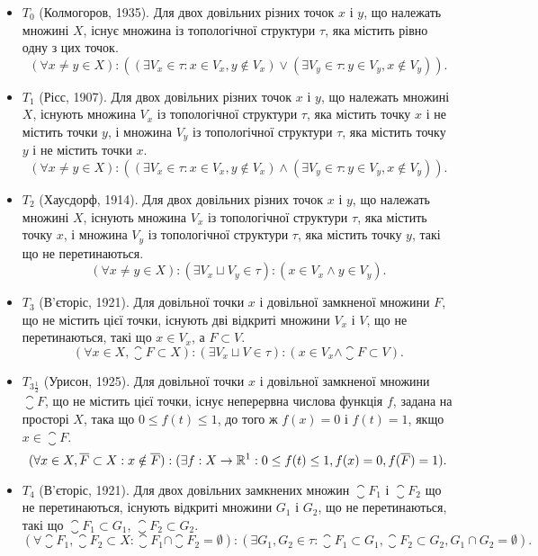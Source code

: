 \begin{itemize}
\item $T_0$ (Колмогоров, 1935). Для двох довільних різних точок
$x$ і $y$, що належать множині $X$, існує множина із
топологічної структури $\tau$, яка містить рівно одну з цих
точок.
\[ (\forall x \ne y \in X): ((\exists V_x \in \tau: x \in V_x, y \notin V_x) \lor (\exists V_y \in \tau: y \in V_y, x \notin V_y)). \]

\item $T_1$ (Рісс, 1907). Для двох довільних різних точок $x$ і $y$,
що належать множині $X$, існують множина $V_x$ із
топологічної структури $\tau$, яка містить точку $x$ і не
містить точки $y$, і множина $V_y$ із топологічної
структури $\tau$, яка містить точку $y$ і не містить точки $x$.
\[ (\forall x \ne y \in X): ((\exists V_x \in \tau: x \in V_x, y \notin V_x) \land (\exists V_y \in \tau: y \in V_y, x \notin V_y)). \]

\item $T_2$ (Хаусдорф, 1914). Для двох довільних різних точок $x$ і
$y$, що належать множині $X$, існують множина $V_x$ із
топологічної структури $\tau$, яка містить точку $x$, і
множина $V_y$ із топологічної структури $\tau$, яка містить
точку $y$, такі що не перетинаються.
\[ (\forall x \ne y \in X): (\exists V_x \sqcup V_y \in \tau): (x \in V_x \land y \in V_y). \]

\item $T_3$ (В'єторіс, 1921). Для довільної точки $x$ і довільної
замкненої множини $F$, що не містить цієї точки, існують
дві відкриті множини $V_x$ і $V$, що не перетинаються, такі
що $x \in V_x$, а $F \subset V$.
\[ (\forall x \in X, \closure{F} \subset X): (\exists V_x \sqcup V \in \tau): (x \in V_x \land \closure{F} \subset V). \]

\item $T_{3\frac{1}{2}}$ (Урисон, 1925). Для довільної точки $x$ і довільної
замкненої множини $\closure{F}$, що не містить цієї точки, існує
неперервна числова функція $f$, задана на просторі $X$,
така що $0 \le f(t) \le 1$, до того ж $f(x) = 0$ і $f(t) = 1$, якщо
$x \in \closure{F}$.
\begin{equation*}
(\forall x \in X, \overline{F} \subset X: x \notin \overline{F}):
(\exists f: X \to \mathbb{R}^1: 0 \le f(t) \le 1, f(x) = 0, f(\overline{F}) = 1).
\end{equation*}

\item $T_4$ (В'єторіс, 1921). Для двох довільних замкнених
множин $\closure{F_1}$ і $\closure{F_2}$ що не перетинаються, існують відкриті
множини $G_1$ і $G_2$, що не перетинаються, такі що $\closure{F_1} \subset G_1$, $\closure{F_2} \subset G_2$.
\begin{equation*}
(\forall \closure{F_1}, \closure{F_2} \subset X: \closure{F_1} \cap \closure{F_2} = \emptyset):
(\exists G_1, G_2 \in \tau: \closure{F_1} \subset G_1, \closure{F_2} \subset G_2, G_1 \cap G_2 = \emptyset).
\end{equation*}
\end{itemize}


